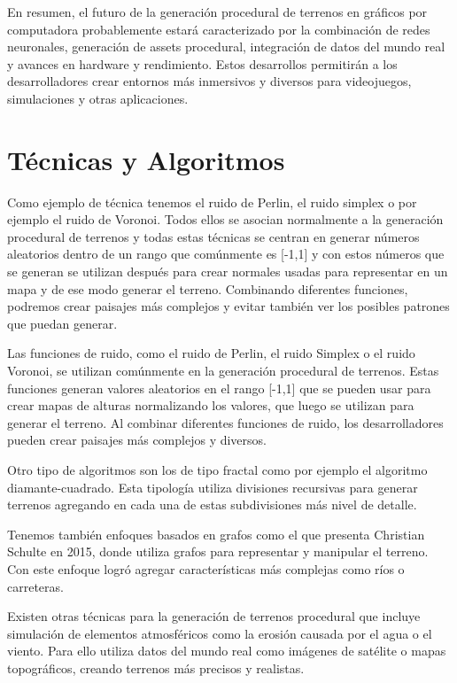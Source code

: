 En resumen, el futuro de la generación procedural de terrenos en gráficos por computadora probablemente estará caracterizado por la combinación de redes neuronales, generación de assets procedural, integración de datos del mundo real y avances en hardware y rendimiento. Estos desarrollos permitirán a los desarrolladores crear entornos más inmersivos y diversos para videojuegos, simulaciones y otras aplicaciones.

\section{Técnicas y Algoritmos}

Como ejemplo de técnica tenemos el ruido de Perlin, el ruido simplex o por ejemplo el ruido de Voronoi. Todos ellos se asocian normalmente a la generación procedural de terrenos y todas estas técnicas se centran en generar números aleatorios dentro de un rango que comúnmente es [-1,1] y con estos números que se generan se utilizan después para crear normales usadas para representar en un mapa y de ese modo generar el terreno. Combinando diferentes funciones, podremos crear paisajes más complejos y evitar también ver los posibles patrones que puedan generar.

Las funciones de ruido, como el ruido de Perlin, el ruido Simplex o el ruido Voronoi, se utilizan comúnmente en la generación procedural de terrenos. Estas funciones generan valores aleatorios en el rango [-1,1] que se pueden usar para crear mapas de alturas normalizando los valores, que luego se utilizan para generar el terreno. Al combinar diferentes funciones de ruido, los desarrolladores pueden crear paisajes más complejos y diversos.

Otro tipo de algoritmos son los de tipo fractal como por ejemplo el algoritmo diamante-cuadrado. Esta tipología utiliza divisiones recursivas para generar terrenos agregando en cada una de estas subdivisiones más nivel de detalle.

Tenemos también enfoques basados en grafos como el que presenta Christian Schulte \cite{ProceduralTerrainGeneration} en 2015, donde utiliza grafos para representar y manipular el terreno. Con este enfoque logró agregar características más complejas como ríos o carreteras.

Existen otras técnicas para la generación de terrenos procedural que incluye simulación de elementos atmosféricos como la erosión causada por el agua o el viento. Para ello utiliza datos del mundo real como imágenes de satélite o mapas topográficos, creando terrenos más precisos y realistas.


